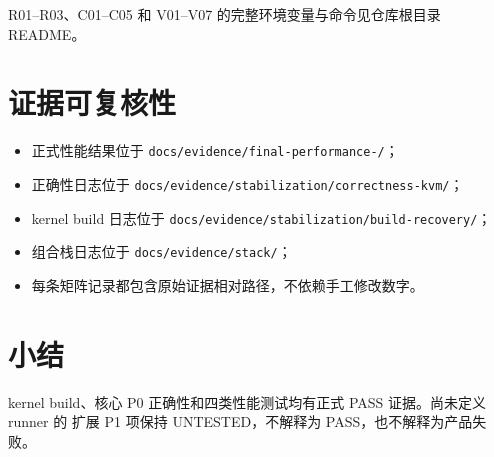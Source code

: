 R01--R03、C01--C05 和 V01--V07 的完整环境变量与命令见仓库根目录 README。

\section{证据可复核性}

\begin{itemize}
    \item 正式性能结果位于 \texttt{docs/\allowbreak evidence/\allowbreak final-\allowbreak performance-/}；
    \item 正确性日志位于 \texttt{docs/\allowbreak evidence/\allowbreak stabilization/\allowbreak correctness-\allowbreak kvm/}；
    \item kernel build 日志位于 \texttt{docs/\allowbreak evidence/\allowbreak stabilization/\allowbreak build-\allowbreak recovery/}；
    \item 组合栈日志位于 \texttt{docs/\allowbreak evidence/\allowbreak stack/}；
    \item 每条矩阵记录都包含原始证据相对路径，不依赖手工修改数字。
\end{itemize}

\section{小结}

kernel build、核心 P0 正确性和四类性能测试均有正式 PASS 证据。尚未定义 runner 的
扩展 P1 项保持 UNTESTED，不解释为 PASS，也不解释为产品失败。